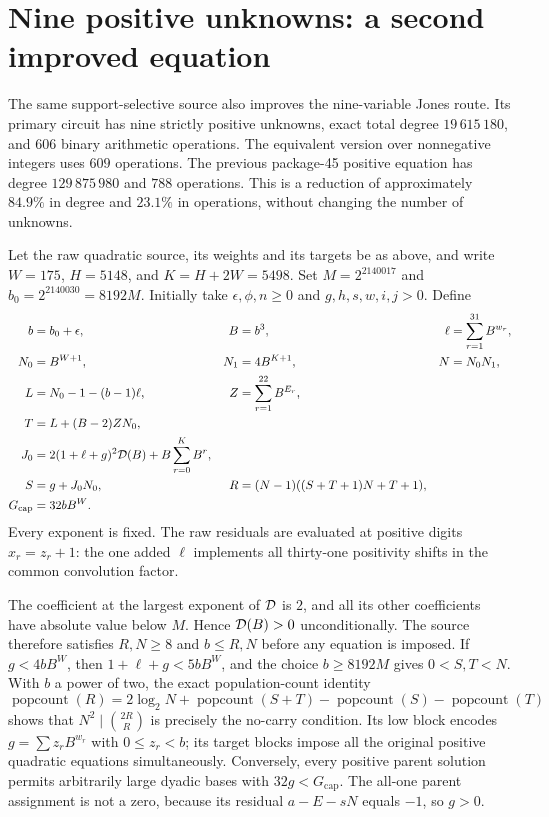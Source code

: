 \section{Nine positive unknowns: a second improved equation}
\label{sec:nine}
The same support-selective source also improves the nine-variable Jones
route.  Its primary circuit has nine strictly positive unknowns, exact
total degree $19\,615\,180$, and $606$ binary arithmetic operations.  The
equivalent version over nonnegative integers uses $609$ operations.  The
previous package-45 positive equation has degree $129\,875\,980$ and $788$
operations.  This is a reduction of approximately $84.9\%$ in degree and
$23.1\%$ in operations, without changing the number of unknowns.

Let the raw quadratic source, its weights and its targets be as above, and
write $W=175$, $H=5148$, and $K=H+2W=5498$.  Set
$M=2^{2140017}$ and $b_0=2^{2140030}=8192M$.  Initially take
$\epsilon,\phi,n\geq0$ and $g,h,s,w,i,j>0$. Define
\begin{align*}
b&=b_0+\epsilon,& B&=b^3,& \ell&=\sum_{r=1}^{31}B^{w_r},\\
N_0&=B^{W+1},&N_1&=4B^{K+1},&N&=N_0N_1,\\
L&=N_0-1-(b-1)\ell,& Z&=\sum_{r=1}^{22}B^{E_r},\\
T&=L+(B-2)ZN_0,&&&\\
J_0&=2(1+\ell+g)^2\mathcal D(B)+B\sum_{r=0}^{K}B^r,&&&\\
S&=g+J_0N_0,&R&=(N-1)((S+T+1)N+T+1),\\
G_{\mathrm{cap}}&=32bB^W.&&&
\end{align*}
Every exponent is fixed.  The raw residuals are evaluated at positive
digits $x_r=z_r+1$: the one added $\ell$ implements all thirty-one
positivity shifts in the common convolution factor.

The coefficient at the largest exponent of $\mathcal D$ is $2$, and all its other
coefficients have absolute value below $M$. Hence $\mathcal D(B)>0$ unconditionally.
The source therefore satisfies $R,N\geq8$ and $b\leq R,N$ before any
equation is imposed. If $g<4bB^W$, then $1+\ell+g<5bB^W$, and the choice
$b\geq8192M$ gives $0<S,T<N$.  With $b$ a power of two, the exact
population-count identity
\[
\operatorname{popcount}(R)=2\log_2N+
\operatorname{popcount}(S+T)-\operatorname{popcount}(S)
-\operatorname{popcount}(T)
\]
shows that $N^2\mid\binom{2R}{R}$ is precisely the no-carry condition.
Its low block encodes $g=\sum z_rB^{w_r}$ with $0\leq z_r<b$; its target
blocks impose all the original positive quadratic equations simultaneously.
Conversely, every positive parent solution permits arbitrarily large
dyadic bases with $32g<G_{\mathrm{cap}}$.  The all-one parent assignment
is not a zero, because its residual $a-E-sN$ equals $-1$, so $g>0$.

